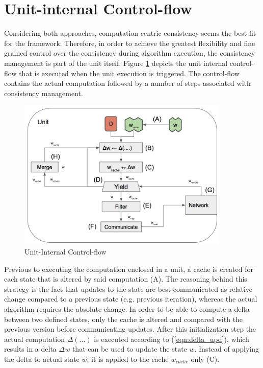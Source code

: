 \section{Unit-internal Control-flow}
Considering both approaches, computation-centric consistency seems the best fit for the framework.
Therefore, in order to achieve the greatest flexibility and fine grained control over the consistency during algorithm execution, the consistency management is part of the unit itself.
Figure \ref{fig:unit_internal_flow} depicts the unit internal control-flow that is executed when the unit execution is triggered.
The control-flow contains the actual computation followed by a number of steps associated with consistency management.
\begin{figure}[ht]
\centering
\includegraphics[width=0.9\textwidth]{img/unit_internal_flow.png}
\caption{Unit-Internal Control-flow}
\label{fig:unit_internal_flow}
\end{figure}
Previous to executing the computation enclosed in a unit, a cache is created for each state that is altered by said computation (A).
The reasoning behind this strategy is the fact that updates to the state are best communicated as relative change compared to a previous state (e.g. previous iteration), whereas the actual algorithm requires the absolute change.
In order to be able to compute a delta between two defined states, only the cache is altered and compared with the previous version before communicating updates.
After this initialization step the actual computation $\Delta(\ldots)$ is executed according to (\ref{eqn:delta_upd}), which results in a delta $\Delta w$ that can be used to update the state $w$.
Instead of applying the delta to actual state $w$, it is applied to the cache $w_{cache}$ only (C).
